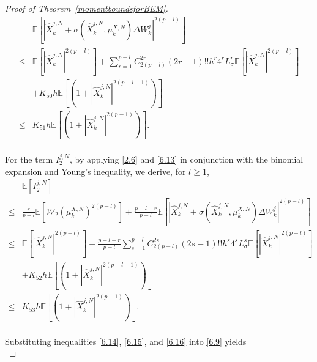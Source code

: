 \documentclass[12pt]{article}
\numberwithin{equation}{section}
\begin{document}
\begin{proof}[Proof of Theorem~\ref{momentboundsforBEM}]
\begin{equation}\tag{5.118}\label{6.15}
\begin{aligned}
&\mathbb{E} \left[ \left| \hat{X}_{k}^{j,N}+\sigma \left( \hat{X}_{k}^{j,N},\mu _{k}^{X,N} \right) \Delta W_{k}^{j} \right|^{2\left( p-l \right)}\right] 
\\
\le&  \mathbb{E} \left[ \left| \hat{X}_{k}^{j,N} \right|^{2\left( p-l \right)}\right]  +\sum_{r=1}^{p-l}{C_{2\left( p-l \right)}^{2r}\left( 2r-1 \right) !!h^r4^rL_{\sigma}^{r}\mathbb{E} \left[ \left| \hat{X}_{k}^{j,N} \right|^{2\left( p-l \right)}\right]} \\
&+K_{50}h\mathbb{E} \left[  \left(1+\left|\hat{X}_{k}^{j,N}\right|^{2\left( p-l-1 \right)}\right)\right] 
\\
\le& K_{51}h \mathbb{E} \left[ \left(1+\left| \hat{X}_{k}^{j,N} \right|^{2\left( p-1 \right)}\right)\right].
\end{aligned}
\end{equation}\\
For the term $ I_2^{j,N} $, by applying \eqref{2.6} and \eqref{6.13} in conjunction with the binomial expansion and Young's inequality, we derive, for $ l \geq 1 $,
\begin{equation}\tag{5.119}\label{6.16}
\begin{aligned}
&\mathbb{E} \left[I_{2}^{j,N}\right]\\
\le& \tfrac{r}{p-l}\mathbb{E} \left[ \mathcal{W} _2\left( \mu _{k}^{X,N} \right) ^{2\left( p-l \right)} \right]+\tfrac{p-l-r}{p-l}\mathbb{E} \left[ \left| \hat{X}_{k}^{j,N}+\sigma \left( \hat{X}_{k}^{j,N},\mu _{k}^{X,N} \right) \Delta W_{k}^{j} \right|^{2\left( p-l \right)} \right] 
\\
\le&  \mathbb{E} \left[\left| \hat{X}_{k}^{j,N} \right|^{2\left( p-l \right)}\right]  +\tfrac{p-l-r}{p-l}\sum_{s=1}^{p-l}{C_{2\left( p-l \right)}^{2s}\left( 2s-1 \right) !!h^s4^sL_{\sigma}^{s} \mathbb{E} \left[\left| \hat{X}_{k}^{j,N} \right|^{2\left( p-l \right)}\right] }\\
&+K_{52}h\mathbb{E} \left[\left( 1+\left|\hat{X}_{k}^{j,N}\right|^{2\left( p-l-1 \right)} \right)\right]
\\
\le& K_{53}h\mathbb{E} \left[\left( 1+\left| \hat{X}_{k}^{j,N} \right|^{2\left( p-1 \right)} \right)\right].
\end{aligned}
\end{equation}\\
Substituting inequalities \eqref{6.14}, \eqref{6.15}, and \eqref{6.16} into \eqref{6.9} yields 
\begin{equation}\tag{5.120}\label{6.17}

\end{equation}
\end{proof}
\end{document}
